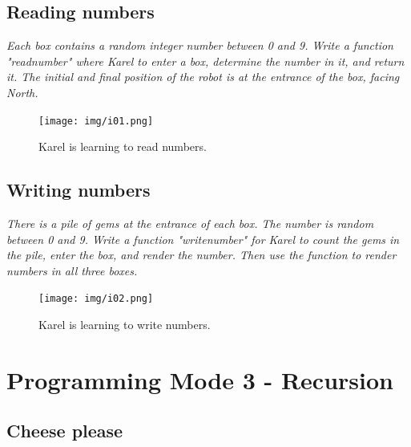 \newpage

\subsection{Reading numbers}

{\em Each box contains a random integer number between 0 and 9. Write a function "readnumber" where Karel to enter a box, determine the number in it, and return it. The initial and final position of the robot is at the entrance of the box, facing North. }\\[-9mm]

\begin{figure}[!ht]
\begin{center}
\texttt{[image: img/i01.png]}
\end{center}
\vspace{-4mm}
\caption{Karel is learning to read numbers.}
\vspace{-12mm}
\label{fig:g10}
\end{figure}


\subsection{Writing numbers}

{\em There is a pile of gems at the entrance of each box. The number is random between 0 and 9. Write a function "writenumber" for Karel to count the gems in the pile, enter the box, and render the number. Then use the function to render numbers in all three boxes.}\\[-9mm]


\begin{figure}[!ht]
\begin{center}
\texttt{[image: img/i02.png]}
\end{center}
\vspace{-4mm}
\caption{Karel is learning to write numbers.}
\label{fig:g11}
\vspace{-12mm}
\end{figure}

\newpage



\section{Programming Mode 3 - Recursion}

\subsection{Cheese please}

